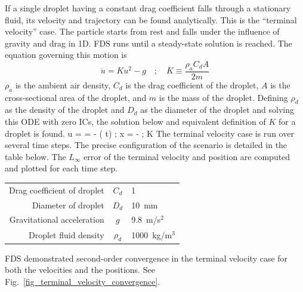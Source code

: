 \documentclass[11pt]{book}
\begin{document}
If a single droplet having a constant drag coefficient falls through a stationary fluid, its velocity and trajectory can be found analytically.
This is the ``terminal velocity'' case. The particle starts from rest and falls under the influence of gravity and drag in 1D.
FDS runs until a steady-state solution is reached. The equation governing this motion is
\[
	\dot{u} = K u^2 - g \quad ; \quad K \equiv \frac{\rho_a C_d A}{2 m}
\]
$\rho_a$ is the ambient air density, $C_d$ is the drag coefficient of the droplet, $A$ is the cross-sectional area of the droplet, and $m$ is the mass of the droplet.
Defining $\rho_d$ as the density of the droplet and $D_d$ as the diameter of the droplet and solving this ODE with zero ICs,
the solution below and equivalent definition of $K$ for a droplet is found.
\be
	u =  = -  \left( t\right) \quad ; \quad
	x = -  \quad ; \quad
	K \equiv {}
\ee
The terminal velocity case is run over several time steps. The precise configuration of the scenario is detailed in the table below.
The $L_\infty$ error of the terminal velocity and position are computed and plotted for each time step.
\begin{center}
\begin{tabular}{|r|c|l|}
\hline
Drag coefficient of droplet & $C_d$ & 1 \\
Diameter of droplet & $D_d$ & 10~mm \\
Gravitational acceleration & $g$ & 9.8~m/s$^2$ \\
Droplet fluid density & $\rho_d$ & 1000~kg/m$^3$ \\
\hline
\end{tabular}
\end{center}
FDS demonstrated second-order convergence in the terminal velocity case for both the velocities and the positions. See Fig.~\ref{fig_terminal_velocity_convergence}.
\end{document}
